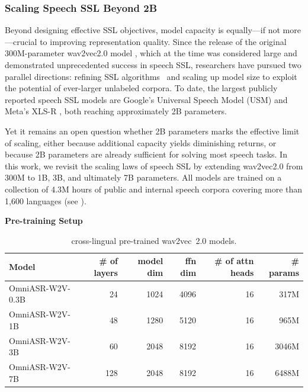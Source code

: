 \documentclass[]{fairmeta}
\begin{document}
\subsubsection{Scaling Speech SSL Beyond 2B}
Beyond designing effective SSL objectives, model capacity is equally—if not more—crucial to improving representation quality. Since the release of the original 300M-parameter wav2vec2.0 model \citep{baevski2020wav2vec}, which at the time was considered large and demonstrated unprecedented success in speech SSL, researchers have pursued two parallel directions: refining SSL algorithms~\citep{hsu2021hubert,chen2022wavlm,chung2021w2v,chiu2022self} and scaling up model size to exploit the potential of ever-larger unlabeled corpora. To date, the largest publicly reported speech SSL models are Google’s Universal Speech Model (USM) \citep{zhang2023google} and Meta’s XLS-R \citep{babu2021xls}, both reaching approximately 2B parameters.

Yet it remains an open question whether 2B parameters marks the effective limit of scaling, either because additional capacity yields diminishing returns, or because 2B parameters are already sufficient for solving most speech tasks. In this work, we revisit the scaling laws of speech SSL by extending wav2vec2.0 from 300M to 1B, 3B, and ultimately 7B parameters. All models are trained on a collection of 4.3M hours of public and internal speech corpora covering more than 1,600 languages (see ).

\textbf{Pre-training Setup}

\begin{table}[htbp]
  \centering
  \begin{tabular}{lrrrrr}
    \toprule
    Model & \# of layers & model dim & ffn dim & \# of attn heads & \# params \\
    \midrule
    OmniASR-W2V-0.3B   &  24  &  1024  &  4096  &  16  &  317M  \\
    OmniASR-W2V-1B     &  48  &  1280  &  5120  &  16  &  965M  \\
    OmniASR-W2V-3B     &  60  &  2048  &  8192  &  16  &  3046M \\
    OmniASR-W2V-7B     & 128  &  2048  &  8192  &  16  &  6488M \\
    \bottomrule
  \end{tabular}
  \caption{\OmniASR cross-lingual pre-trained wav2vec~2.0 models.}
  \label{tab:w2v2_config}
\end{table}
\end{document}
